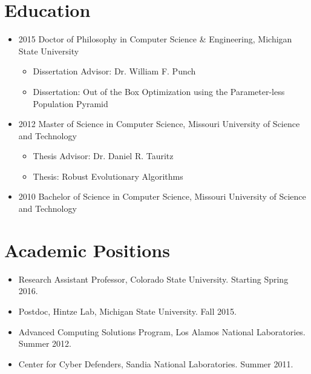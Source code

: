 \documentclass[a4paper,11pt]{article}
\begin{document}
\maketitle
 
\section{Education}
\begin{itemize}
\item 2015 Doctor of Philosophy in Computer Science \& Engineering, Michigan State University
\begin{itemize}
  \item Dissertation Advisor:  Dr. William F. Punch%
  \item Dissertation: Out of the Box Optimization using the Parameter-less Population Pyramid
\end{itemize}
\item 2012 Master of Science in Computer Science, Missouri University of Science and Technology
\begin{itemize}
  \item Thesis Advisor:  Dr. Daniel R. Tauritz%
  \item Thesis: Robust Evolutionary Algorithms
\end{itemize}
\item 2010 Bachelor of Science in Computer Science, Missouri University of Science and Technology
\end{itemize}
\section{Academic Positions}
\begin{itemize}
\item Research Assistant Professor, Colorado State University. Starting Spring 2016.
\item Postdoc, Hintze Lab, Michigan State University. Fall 2015.
\item Advanced Computing Solutions Program, Los Alamos National Laboratories. Summer 2012.
\item Center for Cyber Defenders, Sandia National Laboratories. Summer 2011.
\end{itemize}
\end{document}
